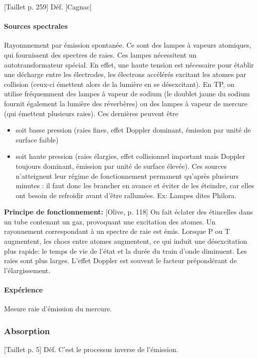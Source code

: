 \documentclass[11pt]{report}
\numberwithin{figure}{section}
\numberwithin{equation}{section}
\numberwithin{table}{section}
\newcommand{\1}{\boldsymbol{1}}
\begin{document}
[Taillet p. 259] Déf. [Cagnac] 

\paragraph{Sources spectrales} Rayonnnement par émission spontanée. Ce sont des lampes à vapeurs atomiques, qui fournissent des spectres de raies. Ces lampes nécessitent un autotransformateur spécial. En effet, une haute tension est nécessaire pour établir une décharge entre les électrodes, les électrons accélérés excitant les atomes par collision (ceux-ci émettent alors de la lumière en se désexcitant). En TP, on utilise fréquemment des lampes à vapeur de sodium (le doublet jaune du sodium fournit également la lumière des réverbères) ou des lampes à vapeur de mercure (qui émettent plusieurs raies). Ces dernières peuvent être
\begin{itemize}
\item soit basse pression (raies fines, effet Doppler dominant, émission par unité de surface faible)
\item soit haute pression (raies élargies, effet collisionnel important mais Doppler toujours dominant, émission par unité de surface élevée). Ces sources n’atteignent leur régime de fonctionnement permanent qu’après plusieurs minutes : il faut donc les brancher en avance et éviter de les éteindre, car elles ont besoin de refroidir avant d’être rallumées. Ex: Lampes dites Philora. 
\end{itemize}
\textbf{Principe de fonctionnement:} [Olive, p. 118] On fait éclater des étincelles dans un tube contenant un gaz, provoquant une excitation des atomes. Un rayonnement correspondant à un spectre de raie est émis. Lorsque P ou T augmentent, les chocs entre atomes augmentent, ce qui induit une désexcitation plus rapide: le temps de vie de l'état et la durée du train d'onde diminuent. Les raies sont plus larges. L'effet Doppler est souvent le facteur prépondérant de l'élargissement.

\paragraph*{Expérience} Mesure raie d'émission du mercure.
  
\subsubsection{Absorption}

[Taillet p. 5] Déf. C'est le processus inverse de l'émission.
\end{document}
